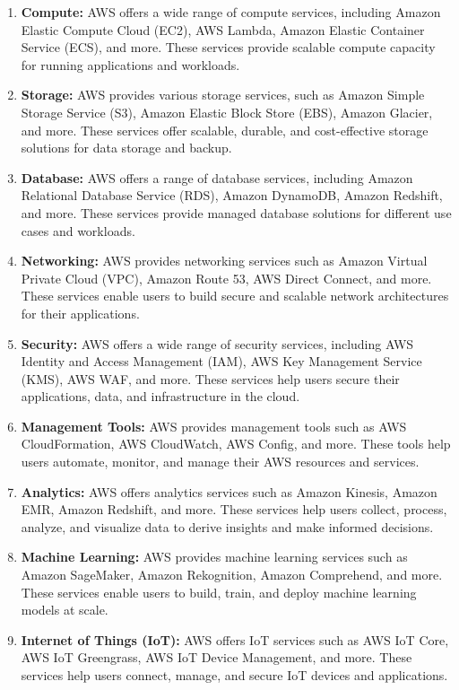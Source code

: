 \documentclass[11pt]{article}
\begin{document}
\begin{enumerate}
    \item \textbf{Compute:} AWS offers a wide range of compute services, including Amazon Elastic Compute Cloud (EC2), AWS Lambda, Amazon Elastic Container Service (ECS), and more. These services provide scalable compute capacity for running applications and workloads.
    \item \textbf{Storage:} AWS provides various storage services, such as Amazon Simple Storage Service (S3), Amazon Elastic Block Store (EBS), Amazon Glacier, and more. These services offer scalable, durable, and cost-effective storage solutions for data storage and backup.
    \item \textbf{Database:} AWS offers a range of database services, including Amazon Relational Database Service (RDS), Amazon DynamoDB, Amazon Redshift, and more. These services provide managed database solutions for different use cases and workloads.
    \item \textbf{Networking:} AWS provides networking services such as Amazon Virtual Private Cloud (VPC), Amazon Route 53, AWS Direct Connect, and more. These services enable users to build secure and scalable network architectures for their applications.
    \item \textbf{Security:} AWS offers a wide range of security services, including AWS Identity and Access Management (IAM), AWS Key Management Service (KMS), AWS WAF, and more. These services help users secure their applications, data, and infrastructure in the cloud.
    \item \textbf{Management Tools:} AWS provides management tools such as AWS CloudFormation, AWS CloudWatch, AWS Config, and more. These tools help users automate, monitor, and manage their AWS resources and services.
    \item \textbf{Analytics:} AWS offers analytics services such as Amazon Kinesis, Amazon EMR, Amazon Redshift, and more. These services help users collect, process, analyze, and visualize data to derive insights and make informed decisions.
    \item \textbf{Machine Learning:} AWS provides machine learning services such as Amazon SageMaker, Amazon Rekognition, Amazon Comprehend, and more. These services enable users to build, train, and deploy machine learning models at scale.
    \item \textbf{Internet of Things (IoT):} AWS offers IoT services such as AWS IoT Core, AWS IoT Greengrass, AWS IoT Device Management, and more. These services help users connect, manage, and secure IoT devices and applications.

\end{enumerate}
\end{document}
